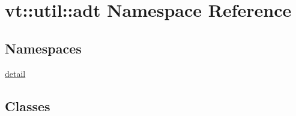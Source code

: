 \hypertarget{namespacevt_1_1util_1_1adt}{}\section{vt\+:\+:util\+:\+:adt Namespace Reference}
\label{namespacevt_1_1util_1_1adt}
\subsection*{Namespaces}
\begin{DoxyCompactItemize}
\item 
 \hyperlink{namespacevt_1_1util_1_1adt_1_1detail}{detail}
\end{DoxyCompactItemize}
\subsection*{Classes}
